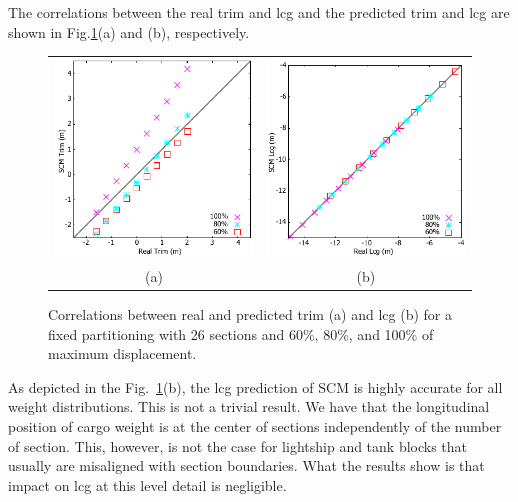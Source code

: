 \documentclass[runningheads]{llncs}
\begin{document}
The correlations between the real trim and lcg and the predicted trim and lcg are shown in Fig.\ref{fig:trimlcgscatter}(a) and (b), respectively.
\begin{figure}[h!]
\begin{center}
 \begin{tabular}{cc}
  \includegraphics[scale=0.98]{figures/TrimScatter} &  \includegraphics[scale=0.997]{figures/LcgScatter} \\
  (a) &  (b)
\end{tabular}  
\end{center}
\caption{Correlations between real and predicted trim (a) and lcg (b) for a fixed partitioning with 26 sections and 60\%, 80\%, and 100\% of maximum displacement.}
\label{fig:trimlcgscatter}
\end{figure}
As depicted in the Fig.~\ref{fig:trimlcgscatter}(b), the lcg prediction of SCM is highly accurate for all weight distributions. This is not a trivial result. We have that the longitudinal position of cargo weight is at the center of sections independently of the number of section. This, however, is not the case for lightship and tank blocks that usually are misaligned with section boundaries. What the results show is that impact on lcg at this level detail is negligible. 
\end{document}
